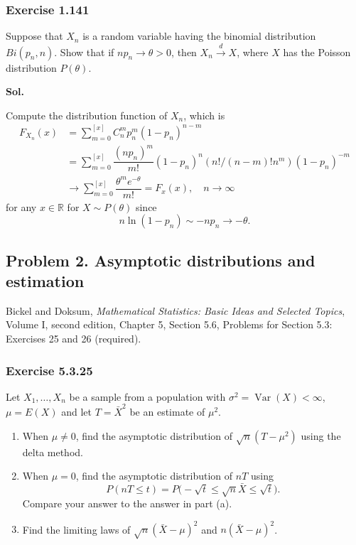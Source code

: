\documentclass[lang=en,11pt,a4paper,citestyle=authoryear,nobib=true]{elegantpaper}
\newcommand{\R}{\mathbb{R}}
\begin{document}
\subsubsection*{Exercise 1.141}
Suppose that $X_n$ is a random variable having the binomial distribution
$Bi(p_n,n)$. Show that if $np_n\to\theta>0$, then $X_n\xrightarrow{d}X$,
where $X$ has the Poisson distribution $P(\theta)$.

\par\vspace{0.5em}\noindent\textbf{Sol.}\par\vspace{3em}
Compute the distribution function of $X_n$, which is
\[
\begin{aligned}
F_{X_n}(x) &= \sum\limits_{m=0}^{[x]} C_n^mp_n^{m}(1-p_n)^{n-m} \\
&= \sum\limits_{m=0}^{[x]} \dfrac{(np_n)^m}{m!}(1-p_n)^{n}(n!/(n-m)!n^m)(1-p_n)^{-m} \\
&\to \sum\limits_{m=0}^{[x]} \dfrac{\theta^me^{-\theta}}{m!} = F_x(x),\quad n\to\infty
\end{aligned}
\]
for any $x \in \R$ for $X \sim P(\theta)$ since
\[
n\ln(1-p_n) \sim -np_n \to -\theta.
\]
\newpage
\subsection*{Problem 2. Asymptotic distributions and estimation}
Bickel and Doksum, \textit{Mathematical Statistics: Basic Ideas and Selected
Topics}, Volume I, second edition, Chapter 5, Section 5.6,
Problems for Section 5.3: Exercises 25 and 26 (required).

\subsubsection*{Exercise 5.3.25}
Let $X_1,\ldots,X_n$ be a sample from a population with
$\sigma^2=\operatorname{Var}(X)<\infty$, $\mu=E(X)$ and let
$T=\bar X^2$ be an estimate of $\mu^2$.
\begin{enumerate}[label=(\alph*),leftmargin=*]
\item When $\mu\neq0$, find the asymptotic distribution of
$\sqrt n(T-\mu^2)$ using the delta method.
\item When $\mu=0$, find the asymptotic distribution of $nT$ using
\[
P(nT\leq t)=P\bigl(-\sqrt t\leq\sqrt n\bar X\leq\sqrt t\bigr).
\]
Compare your answer to the answer in part (a).
\item Find the limiting laws of $\sqrt n(\bar X-\mu)^2$ and
$n(\bar X-\mu)^2$.
\end{enumerate}
\end{document}
